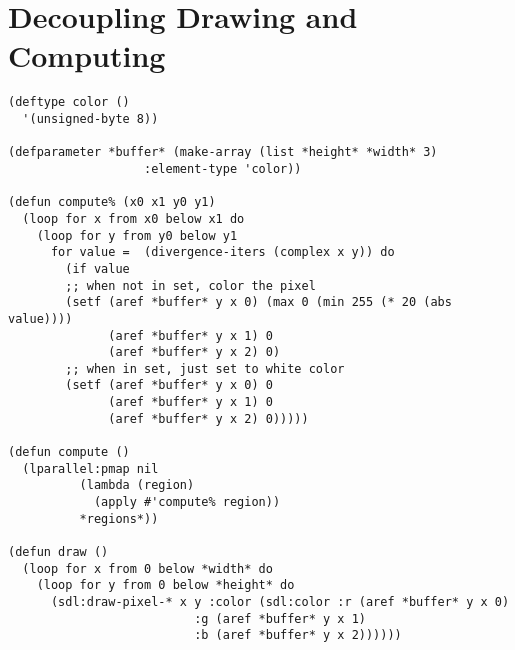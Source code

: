 \documentclass[11pt,a4paper]{article}
\begin{document}
\section{Decoupling Drawing and Computing}
\label{sec:org193c1e0}
\begin{lstlisting}
(deftype color ()
  '(unsigned-byte 8))

(defparameter *buffer* (make-array (list *height* *width* 3)
				   :element-type 'color))

(defun compute% (x0 x1 y0 y1) 
  (loop for x from x0 below x1 do
    (loop for y from y0 below y1 
	  for value =  (divergence-iters (complex x y)) do
	    (if value 
		;; when not in set, color the pixel
		(setf (aref *buffer* y x 0) (max 0 (min 255 (* 20 (abs value))))
		      (aref *buffer* y x 1) 0
		      (aref *buffer* y x 2) 0)
		;; when in set, just set to white color
		(setf (aref *buffer* y x 0) 0
		      (aref *buffer* y x 1) 0
		      (aref *buffer* y x 2) 0)))))

(defun compute ()
  (lparallel:pmap nil 
		  (lambda (region)
		    (apply #'compute% region))
		  *regions*))

(defun draw ()
  (loop for x from 0 below *width* do
    (loop for y from 0 below *height* do
      (sdl:draw-pixel-* x y :color (sdl:color :r (aref *buffer* y x 0)
					      :g (aref *buffer* y x 1)
					      :b (aref *buffer* y x 2))))))
\end{lstlisting}
\end{document}
